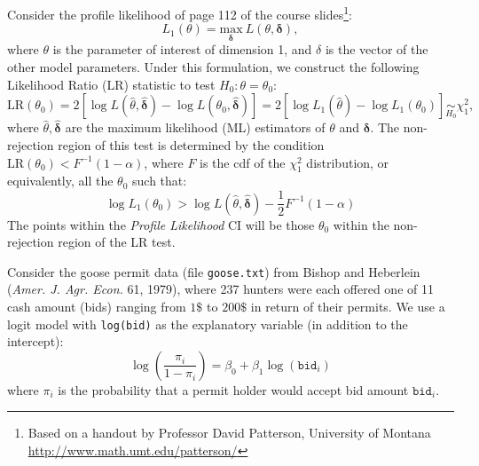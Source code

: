 \documentclass[a4paper,12pt]{article}\usepackage[]{graphicx}\usepackage[]{color}
\def\op{\left(}
\def\cp{\right)}
\def\oc{\left[}
\def\cc{\right]}
\begin{document}
Consider the profile likelihood of page 112 of the course slides\footnote{Based on a handout by Professor David Patterson, University of Montana \url{http://www.math.umt.edu/patterson/}}: 
%
\begin{equation*}
    L_1\op\theta\cp = \underset{\mathbf{\delta}}{\mathrm{max}} \ L\op\theta, \mathbf{\delta} \cp, 
\end{equation*}
%
where $\theta$ is the parameter of interest of dimension 1, and $\delta$ is the
vector of the other model parameters. Under this formulation, we construct the following Likelihood
Ratio (LR) statistic to test $H_0 : \theta = \theta_0$: 
%
\begin{equation*}
    \mathrm{LR}\op \theta_0\cp = 
    2\oc \log L\op \widehat{\theta} , \widehat{\mathbf{\delta}}\cp - \log L\op \theta_0 , \widehat{\mathbf{\delta}}\cp\cc = 
    2 \oc \log L_1\op\widehat{\theta}\cp - \log L_1\op\theta_0\cp \cc \underset{H_0}{\sim}\chi^2_1,
\end{equation*}
%
where $\widehat{\theta}, \widehat{\mathbf{\delta}}$ are the maximum likelihood
(ML) estimators of $\theta$ and $\mathbf{\delta}$. The non-rejection region of
this test is determined by the condition $\mathrm{LR}\op\theta_0\cp < F^{-1}\op
1-\alpha\cp$, where $F$ is the cdf of the $\chi^2_1$ distribution, or
equivalently, all the $\theta_0$ such that: 
%
\begin{equation} \label{eq:nonrejection}
    \log L_1\op \theta_0\cp > \log L\op\widehat{\theta},\widehat{\mathbf{\delta}}\cp - \frac{1}{2}F^{-1}\op 1-\alpha\cp
\end{equation}
%
The points within the \emph{Profile Likelihood} CI will be those $\theta_0$ within the non-rejection region of the LR test.

Consider the goose permit data (file \texttt{goose.txt}) from Bishop and Heberlein (\textit{Amer. J. Agr. Econ.} 61, 1979), where 237 hunters were each offered one of 11 cash amount (bids) ranging from $1\$ $ to $ 200 \$ $ in return of their permits. We use a logit model with \texttt{log(bid)} as the explanatory variable (in addition to the intercept):
$$\log \op \frac{\pi_i}{1-\pi_i} \cp = \beta_0  + \beta_1 \log(\texttt{bid}_i) $$
where $\pi_i$ is the probability that a permit holder would accept bid amount $\texttt{bid}_i$.
\end{document}
